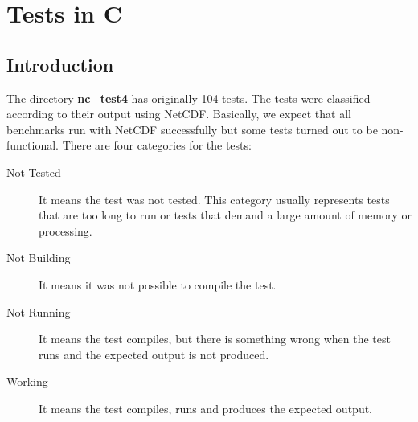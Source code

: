 \chapter{Tests in C}
\label{ch:nctests}

\section{Introduction}

The directory \textbf{nc\_test4} has originally 104 tests.
The tests were classified according to their output using NetCDF.
Basically, we expect that all benchmarks run with NetCDF successfully but some tests turned out to be non-functional.
There are four categories for the tests:

\begin{description}

\item[Not Tested] It means the test was not tested.
This category usually represents tests that are too long to run or tests that demand a large amount of memory or processing.

\item[Not Building] It means it was not possible to compile the test.

\item[Not Running] It means the test compiles, but there is something wrong when the test runs and the expected output is not produced.

\item[Working] It means the test compiles, runs and produces the expected output.

\end{description}


